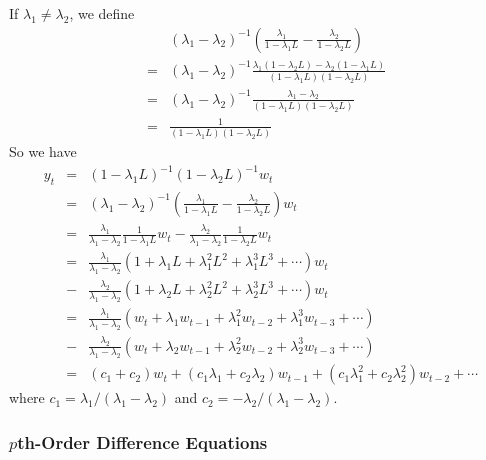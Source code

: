 If $\lambda_{1}\neq \lambda_{2}$, we define
\begin{eqnarray*}
&&(\lambda_{1}-\lambda_{2})^{-1}\left(\frac{\lambda_{1}}{1-\lambda_{1}L}-\frac{\lambda_{2}}{1-\lambda_{2}L}\right)\\
&=&(\lambda_{1}-\lambda_{2})^{-1}\frac{\lambda_{1}(1-\lambda_{2}L)-\lambda_{2}(1-\lambda_{1}L)}{(1-\lambda_{1}L)(1-\lambda_{2}L)}\\
&=&(\lambda_{1}-\lambda_{2})^{-1}\frac{\lambda_{1}-\lambda_{2}}{(1-\lambda_{1}L)(1-\lambda_{2}L)}\\
&=&\frac{1}{(1-\lambda_{1}L)(1-\lambda_{2}L)}
\end{eqnarray*}
So we have
\begin{eqnarray*}
y_{t}&=&(1-\lambda_{1}L)^{-1}(1-\lambda_{2}L)^{-1}w_{t}\\
&=&(\lambda_{1}-\lambda_{2})^{-1}\left(\frac{\lambda_{1}}{1-\lambda_{1}L}-\frac{\lambda_{2}}{1-\lambda_{2}L}\right)w_{t}\\
&=&\frac{\lambda_{1}}{\lambda_{1}-\lambda_{2}}\frac{1}{1-\lambda_{1}L}w_{t}-\frac{\lambda_{2}}{\lambda_{1}-\lambda_{2}}\frac{1}{1-\lambda_{2}L}w_{t}\\
&=&\frac{\lambda_{1}}{\lambda_{1}-\lambda_{2}}(1+\lambda_{1}L+\lambda_{1}^{2}L^{2}+\lambda_{1}^{3}L^{3}+\cdots)w_{t}\\
&-&\frac{\lambda_{2}}{\lambda_{1}-\lambda_{2}}(1+\lambda_{2}L+\lambda_{2}^{2}L^{2}+\lambda_{2}^{3}L^{3}+\cdots)w_{t}\\
&=&\frac{\lambda_{1}}{\lambda_{1}-\lambda_{2}}(w_{t}+\lambda_{1}w_{t-1}+\lambda_{1}^{2}w_{t-2}+\lambda_{1}^{3}w_{t-3}+\cdots)\\
&-&\frac{\lambda_{2}}{\lambda_{1}-\lambda_{2}}(w_{t}+\lambda_{2}w_{t-1}+\lambda_{2}^{2}w_{t-2}+\lambda_{2}^{3}w_{t-3}+\cdots)\\
&=&(c_{1}+c_{2})w_{t}+(c_{1}\lambda_{1}+c_{2}\lambda_{2})w_{t-1}+(c_{1}\lambda_{1}^{2}+c_{2}\lambda_{2}^{2})w_{t-2}+\cdots
\end{eqnarray*}
where $c_{1}=\lambda_{1}/(\lambda_{1}-\lambda_{2})$ and $c_{2}=-\lambda_{2}/(\lambda_{1}-\lambda_{2})$.

\subsubsection{$p$th-Order Difference Equations}